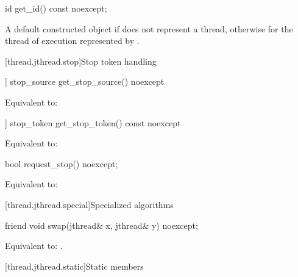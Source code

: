 %
\begin{itemdecl}
id get_id() const noexcept;
\end{itemdecl}

\begin{itemdescr}
\pnum
\returns
A default constructed  object
if  does not represent a thread,
otherwise 
for the thread of execution represented by .
\end{itemdescr}

[thread.jthread.stop]{Stop token handling}

%
\begin{itemdecl}
[[nodiscard]] stop_source get_stop_source() noexcept
\end{itemdecl}

\begin{itemdescr}
\pnum
\effects Equivalent to: 
\end{itemdescr}

%
\begin{itemdecl}
[[nodiscard]] stop_token get_stop_token() const noexcept
\end{itemdecl}

\begin{itemdescr}
\pnum
\effects Equivalent to: 
\end{itemdescr}

%
\begin{itemdecl}
bool request_stop() noexcept;
\end{itemdecl}

\begin{itemdescr}
\pnum
\effects Equivalent to: 
\end{itemdescr}


[thread.jthread.special]{Specialized algorithms}

%
\begin{itemdecl}
friend void swap(jthread& x, jthread& y) noexcept;
\end{itemdecl}

\begin{itemdescr}
\pnum
\effects Equivalent to: .
\end{itemdescr}

[thread.jthread.static]{Static members}

